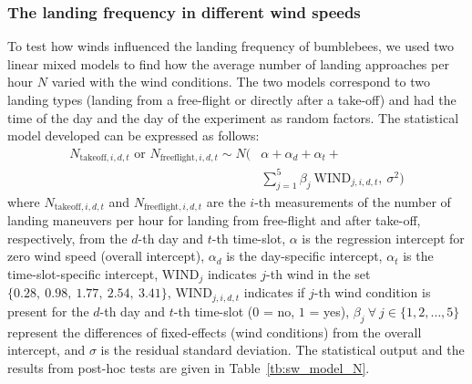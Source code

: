 \subsubsection{The landing frequency in different wind speeds}
To test how winds influenced the landing frequency of bumblebees, we used two linear mixed models to find how the average number of landing approaches per hour $N$ varied with the wind conditions. The two models correspond to two landing types (landing from a free-flight or directly after a take-off) and had the time of the day and the day of the experiment as random factors. The statistical model developed can be expressed as follows:
\begin{equation}
	\label{eq:sw_model_N}
	\begin{array}{lll}
		N_{\textrm{takeoff},i,d,t} \text{ or } N_{\textrm{freeflight},i,d,t} \sim N( \!\!\!\!\!
		& \alpha + \alpha_d + \alpha_t + \\
		& \sum_{j=1}^{5} \beta_j~\textrm{WIND}_{j,i,d,t},~\sigma^2)
	\end{array}
\end{equation}
where $N_{\textrm{takeoff},i,d,t}$ and $N_{\textrm{freeflight},i,d,t} $ are the $i$-th measurements of the number of landing maneuvers per hour for landing from free-flight and after take-off, respectively, from the $d$-th day and $t$-th time-slot, $\alpha$ is the regression intercept for zero wind speed (overall intercept), $\alpha_d$ is the day-specific intercept, $\alpha_t$ is the time-slot-specific intercept, $\textrm{WIND}_j$ indicates $j$-th wind in the set $\{0.28,~0.98,~1.77,~2.54,~3.41\}$, $\textrm{WIND}_{j,i,d,t}$ indicates if $j$-th wind condition is present for the $d$-th day and $t$-th time-slot ($0$ = no, $1$ = yes), $\beta_j~\forall~j \in \{1,2,\ldots,5\}$ represent the differences of fixed-effects (wind conditions) from the overall intercept, and $\sigma$ is the residual standard deviation. The statistical output and the results from post-hoc tests are given in Table~\ref{tb:sw_model_N}.

